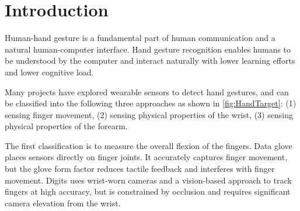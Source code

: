 \documentclass{sigchi}
\begin{document}
\begin{abstract}
We conducted a user study with 10 participants to better understand gesture recognition accuracy and the effects of sensing locations. Results showed that sensor reading patterns differ significantly across users, but are consistent for the same user. The leave-one-user-out accuracy is low at an average of 27.4\%, but reaches 95.8\% average accuracy for 16 popular hand gestures when personalized for each participant. The most promising location spans the 1/8\texttildelow{}1/4 area between the metacarpophalangeal joints (MCP, the knuckles between the hand and fingers) and the head of ulna (tip of the wrist).


\end{abstract}






\section{Introduction}
Human-hand gesture is a fundamental part of human communication and a natural human-computer interface. Hand gesture recognition enables humans to be understood by the computer and interact naturally with lower learning efforts and lower cognitive load.

Many projects have explored wearable sensors to detect hand gestures, and can be classified into the following three approaches as shown in \autoref{fig:HandTarget}: (1) sensing finger movement, (2) sensing physical properties of the wrist, (3) sensing physical properties of the forearm.

The first classification is to measure the overall flexion of the fingers. Data glove \cite{4539650} places sensors directly on finger joints. It accurately captures finger movement, but the glove form factor reduces tactile feedback and interferes with finger movement. Digits \cite{Kim:2012:DFI:2380116.2380139} uses wrist-worn cameras and a vision-based approach to track fingers at high accuracy, but is constrained by occlusion and requires significant camera elevation from the wrist. 
\end{document}
